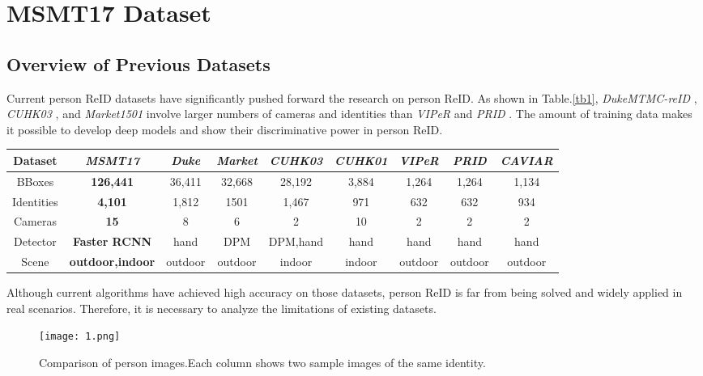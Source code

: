 \documentclass[10pt,twocolumn,letterpaper]{article}
\begin{document}
\section{MSMT17 Dataset}
\subsection{Overview of Previous Datasets}
Current person ReID datasets have significantly pushed forward the research on person ReID. As shown in Table.\ref{tb1}, \textit{DukeMTMC-reID} \cite{zheng2017unlabeled}, \textit{CUHK03} \cite{li2014deepreid}, and \textit{Market1501} \cite{zheng2015scalable} involve larger numbers of cameras and identities than \textit{VIPeR} \cite{gray2008viewpoint} and \textit{PRID} \cite{hirzer2011person}. The amount of training data makes it possible to develop deep models and show their
discriminative power in person ReID.
%
\begin{table*}[ht]
\caption{Comparison between \textit{MST17} and other person ReID datasets.}
\label{tb1}
\begin{tabular}{c|c|c|c|c|c|c|c|c}
	\hline 
	Dataset & \textit{\textbf{MSMT17}} & \textit{Duke} \cite{zheng2017unlabeled}& \textit{Market} \cite{zheng2015scalable}& \textit{CUHK03} \cite{li2014deepreid}& \textit{CUHK01} \cite{li2012human}& \textit{VIPeR} \cite{gray2008viewpoint}& \textit{PRID} \cite{hirzer2011person}& \textit{CAVIAR} \cite{cheng2011custom}\\
	\hline
	\hline
	BBoxes & \textbf{126,441} & 36,411 & 32,668 & 28,192 & 3,884 & 1,264 & 1,264 & 1,134 \\ 
	\hline 
	Identities & \textbf{4,101} & 1,812 & 1501 & 1,467 & 971 & 632 & 632 & 934 \\ 
	\hline 
	Cameras & \textbf{15} & 8 & 6 & 2 & 10 & 2 & 2 & 2 \\ 
	\hline 
	Detector & \textbf{Faster RCNN} & hand & DPM & DPM,hand & hand & hand & hand & hand \\ 
	\hline 
	Scene & \textbf{outdoor,indoor} & outdoor & outdoor & indoor & indoor & outdoor & outdoor & outdoor \\ 
	\hline 
\end{tabular}
\end{table*}
Although current algorithms have achieved high accuracy on those datasets,
person ReID is far from being solved and widely applied
in real scenarios. Therefore, it is necessary to analyze the
limitations of existing datasets.
\begin{figure}[t]
	\centering
	\texttt{[image: 1.png]}
	\caption{Comparison of person images.Each column
		shows two sample images of the same identity.}
	\label{fig1}
\end{figure}
\end{document}
